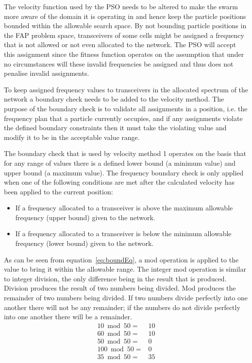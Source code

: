 The velocity function used by the \gls{PSO} needs to be altered to make the swarm more aware of the domain it is operating in and hence keep the particle positions bounded within the allowable search space. By not bounding particle positions in the \gls{FAP} problem space, transceivers of some cells might be assigned a frequency that is not allowed or not even allocated to the network. The \gls{PSO} will accept this assignment since the fitness function operates on the assumption that under no circumstances will these invalid frequencies be assigned and thus does not penalise invalid assignments.

To keep assigned frequency values to transceivers in the allocated spectrum of the network a boundary check needs to be added to the velocity method. The purpose of the boundary check is to validate all assignments in a position, i.e. the frequency plan that a particle currently occupies, and if any assignments violate the defined boundary constraints then it must take the violating value and modify it to be in the acceptable value range.

The boundary check that is used by velocity method 1 operates on the basis that for any range of values there is a defined lower bound (a minimum value) and upper bound (a maximum value). The frequency boundary check is only applied when one of the following conditions are met after the calculated velocity has been applied to the current position:
\begin{itemize}
\item If a frequency allocated to a transceiver is above the maximum allowable frequency (upper bound) given to the network. 
\item If a frequency allocated to a transceiver is below the minimum allowable frequency (lower bound) given to the network.
\end{itemize}

As can be seen from equation~\ref{eq:boundEq}, a mod operation is applied to the value to bring it within the allowable range. The integer mod operation is similar to integer division, the only difference being in the result that is produced. Division produces the result of two numbers being divided. Mod produces the remainder of two numbers being divided. If two numbers divide perfectly into one another there will not be any remainder; if the numbers do not divide perfectly into one another there will be a remainder. 
\begin{align}
	10 \bmod 50 =& 10 \nonumber \\
	60 \bmod 50 =& 10 \nonumber \\
	50 \bmod 50 =& 0 \nonumber \\
	100 \bmod 50 =& 0 \nonumber \\
	35 \bmod 50 =& 35 \nonumber 
\end{align}

